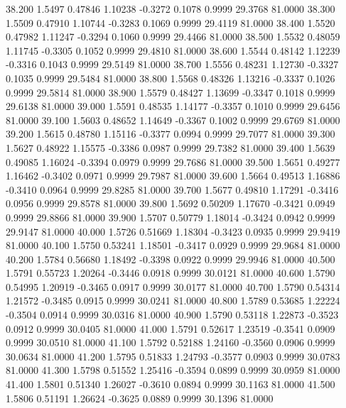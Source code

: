   38.200   1.5497   0.47846   1.10238  -0.3272   0.1078   0.9999  29.3768  81.0000
  38.300   1.5509   0.47910   1.10744  -0.3283   0.1069   0.9999  29.4119  81.0000
  38.400   1.5520   0.47982   1.11247  -0.3294   0.1060   0.9999  29.4466  81.0000
  38.500   1.5532   0.48059   1.11745  -0.3305   0.1052   0.9999  29.4810  81.0000
  38.600   1.5544   0.48142   1.12239  -0.3316   0.1043   0.9999  29.5149  81.0000
  38.700   1.5556   0.48231   1.12730  -0.3327   0.1035   0.9999  29.5484  81.0000
  38.800   1.5568   0.48326   1.13216  -0.3337   0.1026   0.9999  29.5814  81.0000
  38.900   1.5579   0.48427   1.13699  -0.3347   0.1018   0.9999  29.6138  81.0000
  39.000   1.5591   0.48535   1.14177  -0.3357   0.1010   0.9999  29.6456  81.0000
  39.100   1.5603   0.48652   1.14649  -0.3367   0.1002   0.9999  29.6769  81.0000
  39.200   1.5615   0.48780   1.15116  -0.3377   0.0994   0.9999  29.7077  81.0000
  39.300   1.5627   0.48922   1.15575  -0.3386   0.0987   0.9999  29.7382  81.0000
  39.400   1.5639   0.49085   1.16024  -0.3394   0.0979   0.9999  29.7686  81.0000
  39.500   1.5651   0.49277   1.16462  -0.3402   0.0971   0.9999  29.7987  81.0000
  39.600   1.5664   0.49513   1.16886  -0.3410   0.0964   0.9999  29.8285  81.0000
  39.700   1.5677   0.49810   1.17291  -0.3416   0.0956   0.9999  29.8578  81.0000
  39.800   1.5692   0.50209   1.17670  -0.3421   0.0949   0.9999  29.8866  81.0000
  39.900   1.5707   0.50779   1.18014  -0.3424   0.0942   0.9999  29.9147  81.0000
  40.000   1.5726   0.51669   1.18304  -0.3423   0.0935   0.9999  29.9419  81.0000
  40.100   1.5750   0.53241   1.18501  -0.3417   0.0929   0.9999  29.9684  81.0000
  40.200   1.5784   0.56680   1.18492  -0.3398   0.0922   0.9999  29.9946  81.0000
  40.500   1.5791   0.55723   1.20264  -0.3446   0.0918   0.9999  30.0121  81.0000
  40.600   1.5790   0.54995   1.20919  -0.3465   0.0917   0.9999  30.0177  81.0000
  40.700   1.5790   0.54314   1.21572  -0.3485   0.0915   0.9999  30.0241  81.0000
  40.800   1.5789   0.53685   1.22224  -0.3504   0.0914   0.9999  30.0316  81.0000
  40.900   1.5790   0.53118   1.22873  -0.3523   0.0912   0.9999  30.0405  81.0000
  41.000   1.5791   0.52617   1.23519  -0.3541   0.0909   0.9999  30.0510  81.0000
  41.100   1.5792   0.52188   1.24160  -0.3560   0.0906   0.9999  30.0634  81.0000
  41.200   1.5795   0.51833   1.24793  -0.3577   0.0903   0.9999  30.0783  81.0000
  41.300   1.5798   0.51552   1.25416  -0.3594   0.0899   0.9999  30.0959  81.0000
  41.400   1.5801   0.51340   1.26027  -0.3610   0.0894   0.9999  30.1163  81.0000
  41.500   1.5806   0.51191   1.26624  -0.3625   0.0889   0.9999  30.1396  81.0000
